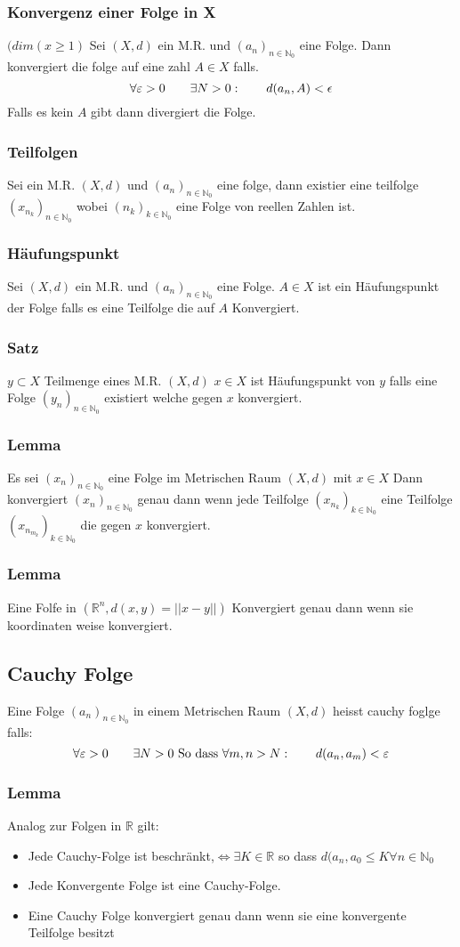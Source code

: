 \documentclass{article}
\newcommand{\mspc}{\hspace{0.7cm}}
\newcommand{\lemma}[1]{\subsubsection*{Lemma {#1}}}
\begin{document}
\subsubsection*{Konvergenz einer Folge in X} $(dim(x\ge1)$ Sei $(X,d)$ ein M.R. und $(a_n)_{n\in\mathbb{N}_0}$ eine Folge.  Dann konvergiert die folge auf eine zahl $A\in X$ falls.
\[\forall\varepsilon>0\mspc\exists N>0:\mspc d(a_n,A)<\epsilon\]
Falls es kein $A$ gibt dann divergiert die Folge.
\subsubsection*{Teilfolgen} Sei ein M.R. $(X,d)$ und $(a_n)_{n\in\mathbb{N}_0}$ eine folge, dann existier eine teilfolge $(x_{n_k})_{n\in\mathbb{N}_0}$ wobei $(n_k)_{k\in\mathbb{N}_0}$ eine Folge von reellen Zahlen ist.
\subsubsection*{Häufungspunkt} Sei $(X,d)$ ein M.R. und $(a_n)_{n\in\mathbb{N}_0}$ eine Folge. $A\in X$ ist ein Häufungspunkt der Folge falls es eine Teilfolge die auf $A$ Konvergiert.
\subsubsection*{Satz} $y\subset X$ Teilmenge eines M.R. $(X,d)$ $x\in X$ ist Häufungspunkt von $y$ falls eine Folge $(y_n)_{n\in\mathbb{N}_0}$ existiert welche gegen $x$ konvergiert.
\lemma{} Es sei $(x_n)_{n\in\mathbb{N}_0}$ eine Folge im Metrischen Raum $(X,d)$ mit $x\in X$ Dann konvergiert $(x_n)_{n\in\mathbb{N}_0}$ genau dann wenn jede Teilfolge $(x_{n_k})_{k\in\mathbb{N}_0}$ eine Teilfolge $(x_{n_{m_k}})_{k\in\mathbb{N}_0}$ die gegen $x$ konvergiert.
\lemma{}Eine Folfe in $(\mathbb{R}^n, d(x,y)=||x-y||)$ Konvergiert genau dann wenn sie koordinaten weise konvergiert.
\subsection{Cauchy Folge}Eine Folge $(a_n)_{n\in\mathbb{N}_0}$ in einem Metrischen Raum $(X,d)$ heisst cauchy foglge falls:\[\forall \varepsilon >0 \mspc \exists N>0 \text{ So dass } \forall m,n >N: \mspc d(a_n,a_m)<\varepsilon\]
\lemma{} Analog zur Folgen in $\mathbb{R}$ gilt:
\begin{itemize}
\item{Jede Cauchy-Folge ist beschränkt,$\Leftrightarrow \exists K\in\mathbb{R}$ so dass $ d(a_n,a_0\le K \forall n\in \mathbb{N}_0$}
\item{Jede Konvergente Folge ist eine Cauchy-Folge.}
\item{Eine Cauchy Folge konvergiert genau dann wenn sie eine konvergente Teilfolge besitzt}
\end{itemize}
\end{document}
